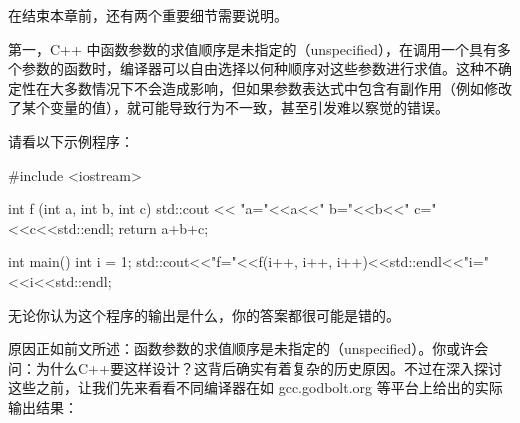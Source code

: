 
在结束本章前，还有两个重要细节需要说明。

第一，C++ 中函数参数的求值顺序是未指定的（unspecified），在调用一个具有多个参数的函数时，编译器可以自由选择以何种顺序对这些参数进行求值。这种不确定性在大多数情况下不会造成影响，但如果参数表达式中包含有副作用（例如修改了某个变量的值），就可能导致行为不一致，甚至引发难以察觉的错误。

请看以下示例程序：

\begin{cpp}
#include <iostream>

int f (int a, int b, int c) {
  std::cout << "a="<<a<<" b="<<b<<" c="<<c<<std::endl;
  return a+b+c;
}

int main() {
  int i = 1;
  std::cout<<"f="<<f(i++, i++, i++)<<std::endl<<"i="<<i<<std::endl;
}
\end{cpp}

无论你认为这个程序的输出是什么，你的答案都很可能是错的。

原因正如前文所述：函数参数的求值顺序是未指定的（unspecified）。你或许会问：为什么C++要这样设计？这背后确实有着复杂的历史原因。不过在深入探讨这些之前，让我们先来看看不同编译器在如 gcc.godbolt.org 等平台上给出的实际输出结果：


